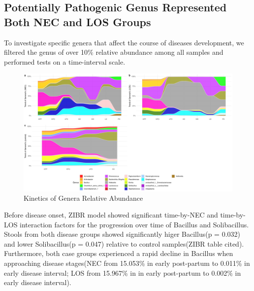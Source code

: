 \documentclass[fleqn,10pt, lineno]{wlpeerj} %
\begin{document}

  \subsection*{Potentially Pathogenic Genus Represented Both NEC and LOS Groups}
  To investigate specific genera that affect the course of diseases development, we filtered the genus of over 10\% relative abundance among all samples and performed tests on a time-interval scale.
  \begin{figure}[ht]\centering
    \includegraphics[width=\linewidth]{figure/taxa-time.pdf}
    \caption{Kinetics of Genera Relative Abundance}
    \label{fig:taxa-time}
  \end{figure}


  \noindent
  Before disease onset, ZIBR model showed significant time-by-NEC and time-by-LOS interaction factors for the progression over time of Bacillus and Solibacillus. Stools from both disease groups showed significantly higer Bacillus(p = 0.032) and lower Solibacillus(p = 0.047) relative to control samples(ZIBR table cited). Furthermore, both case groups experienced a rapid decline in Bacillus when approaching disease stages(NEC from 15.053\% in early post-partum to 0.011\% in early disease interval; LOS from 15.967\% in in early post-partum to 0.002\% in early disease interval).
\end{document}
